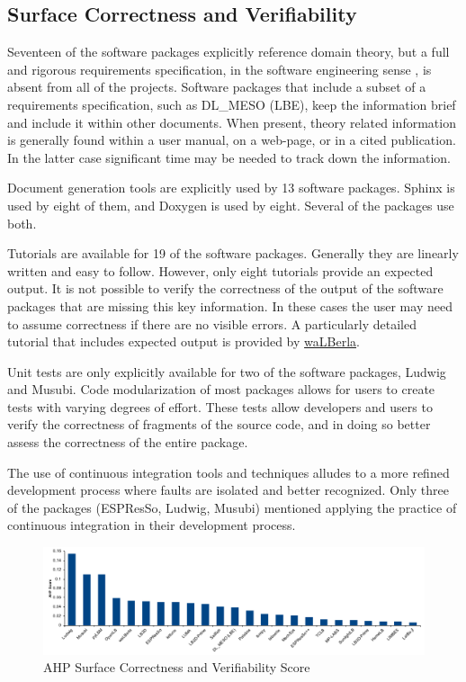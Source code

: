 \documentclass[final, 3p, times, authoryear]{elsarticle}
\begin{document}
\subsection{Surface Correctness and Verifiability} \label{SecSurfCorrectAndVerifiab}

Seventeen of the software packages explicitly reference domain theory, but a
full and rigorous requirements specification, in the software engineering sense
\citep{IEEE1998, RobertsonAndRobertson1999Vol, ESA1991}, is absent from all of
the projects. Software packages that include a subset of a requirements
specification, such as DL\_MESO (LBE), keep the information brief and include it
within other documents. When present, theory related information is generally
found within a user manual, on a web-page, or in a cited publication. In the
latter case significant time may be needed to track down the information.

Document generation tools are explicitly used by 13 software packages. Sphinx is
used by eight of them, and Doxygen is used by eight. Several of the packages use
both.

Tutorials are available for 19 of the software packages. Generally they are
linearly written and easy to follow. However, only eight tutorials provide an
expected output. It is not possible to verify the correctness of the output of
the software packages that are missing this key information. In these cases the
user may need to assume correctness if there are no visible errors.  A
particularly  detailed tutorial that includes expected output is provided by
\href{https://www.walberla.net/doxygen/index.html} {waLBerla}.

Unit tests are only explicitly available for two of the software packages,
Ludwig and Musubi. Code modularization of most packages allows for users to
create tests with varying degrees of effort. These tests allow developers and
users to verify the correctness of fragments of the source code, and in doing so
better assess the correctness of the entire package.

The use of continuous integration tools and techniques alludes to a more refined
development process where faults are isolated and better recognized. Only three
of the packages (ESPResSo, Ludwig, Musubi) mentioned applying the practice of
continuous integration in their development process.

\begin{figure}[h!]
	\begin{center}
		\includegraphics[width=1.0\textwidth]{./figures/correctnessverifiability.pdf}
		\caption{AHP Surface Correctness and Verifiability Score}
		\label{Fig_CorrectnessVerifiability}
	\end{center}
\end{figure}
\end{document}
